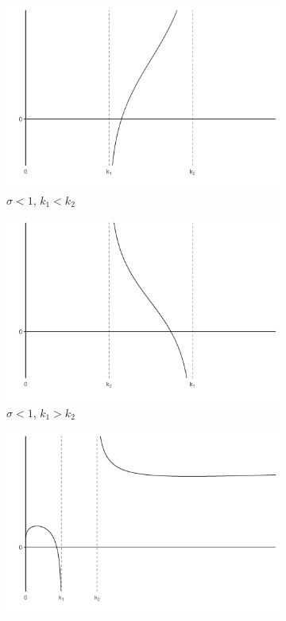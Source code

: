 	\begin{figure}[tb]
		\begin{subfigure}[b]{0.5\linewidth}
			\centering
			\includegraphics[width=1\linewidth]{../result/appendix_A/function_g/graph_a.png} 
			\caption{$\sigma < 1$, $k_1 < k_2$} 
			\label{fig:g_shape_a}
		\end{subfigure}
		\begin{subfigure}[b]{0.5\linewidth}
			\centering
			\includegraphics[width=1\linewidth]{../result/appendix_A/function_g/graph_b.png} 
			\caption{$ \sigma < 1$, $k_1 > k_2$}
			\label{fig:g_shape_b}
		\end{subfigure}
		\begin{subfigure}[b]{0.5\linewidth}
			\centering
			\includegraphics[width=1\linewidth]{../result/appendix_A/function_g/graph_c.png} 

\end{subfigure}
\end{figure}
